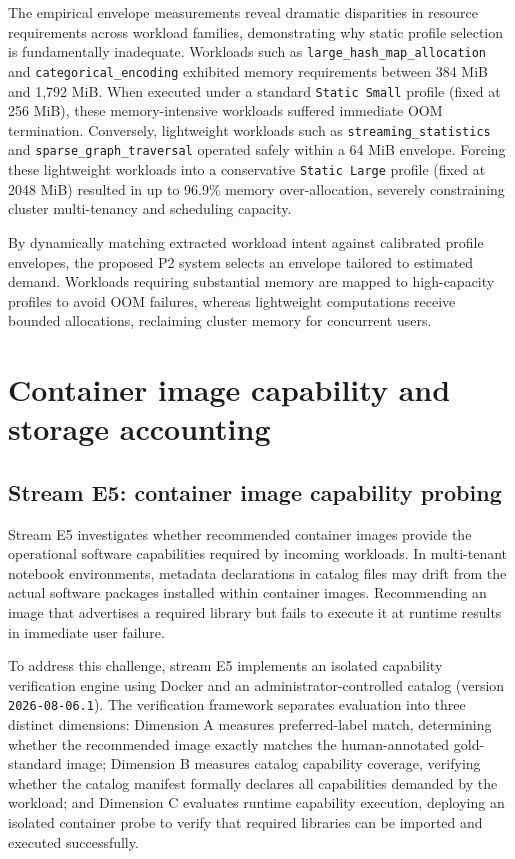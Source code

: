 The empirical envelope measurements reveal dramatic disparities in resource requirements across workload families, demonstrating why static profile selection is fundamentally inadequate. Workloads such as \texttt{large\_hash\_map\_allocation} and \texttt{categorical\_encoding} exhibited memory requirements between 384 MiB and 1,792 MiB. When executed under a standard \texttt{Static Small} profile (fixed at 256 MiB), these memory-intensive workloads suffered immediate OOM termination. Conversely, lightweight workloads such as \texttt{streaming\_statistics} and \texttt{sparse\_graph\_traversal} operated safely within a 64 MiB envelope. Forcing these lightweight workloads into a conservative \texttt{Static Large} profile (fixed at 2048 MiB) resulted in up to 96.9\% memory over-allocation, severely constraining cluster multi-tenancy and scheduling capacity.

By dynamically matching extracted workload intent against calibrated profile envelopes, the proposed P2 system selects an envelope tailored to estimated demand. Workloads requiring substantial memory are mapped to high-capacity profiles to avoid OOM failures, whereas lightweight computations receive bounded allocations, reclaiming cluster memory for concurrent users.

\section{Container image capability and storage accounting}
\label{sec:image_capability_and_storage}

\subsection{Stream E5: container image capability probing}
\label{subsec:e5_capability_probes}

Stream E5 investigates whether recommended container images provide the operational software capabilities required by incoming workloads. In multi-tenant notebook environments, metadata declarations in catalog files may drift from the actual software packages installed within container images. Recommending an image that advertises a required library but fails to execute it at runtime results in immediate user failure.

To address this challenge, stream E5 implements an isolated capability verification engine using Docker and an administrator-controlled catalog (version \texttt{2026-08-06.1}). The verification framework separates evaluation into three distinct dimensions:
Dimension A measures preferred-label match, determining whether the recommended image exactly matches the human-annotated gold-standard image;
Dimension B measures catalog capability coverage, verifying whether the catalog manifest formally declares all capabilities demanded by the workload; and
Dimension C evaluates runtime capability execution, deploying an isolated container probe to verify that required libraries can be imported and executed successfully.

